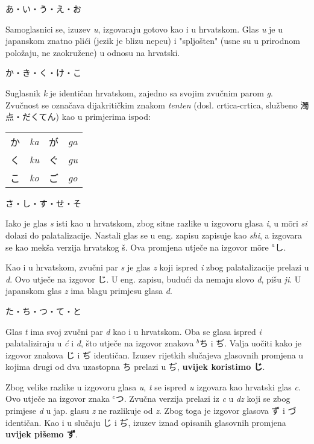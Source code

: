 	
	\noindent\ten あ・い・う・え・お
	
	Samoglasnici se, izuzev \textit{u}, izgovaraju gotovo kao i u hrvatskom. Glas \textit{u} je u japanskom znatno plići (jezik je blizu nepcu) i "spljošten" (usne su u prirodnom položaju, ne zaokružene) u odnosu na hrvatski.
	
	\vspace{5pt}
	\noindent\ten か・き・く・け・こ
	
	Suglasnik \textit{k} je identičan hrvatskom, zajedno sa svojim zvučnim parom \textit{g}. Zvučnost se označava dijakritičkim znakom \textit{tenten} (dosl. crtica-crtica, službeno 濁点・だくてん) kao u primjerima ispod:
	
	\begin{tabular}{l l l l}
		か&\textit{ka}&が&\textit{ga}\\
		く&\textit{ku}&ぐ&\textit{gu}\\
		こ&\textit{ko}&ご&\textit{go}\\
	\end{tabular}

	\vspace{5pt}
	\noindent\ten さ・し・す・せ・そ
	
	Iako je glas \textit{s} isti kao u hrvatskom, zbog sitne razlike u izgovoru glasa \textit{i}, u m\={o}ri \textit{si} dolazi do palatalizacije. Nastali glas se u eng. zapisu zapisuje kao \textit{shi}, a izgovara se kao mekša verzija hrvatskog š. Ova promjena utječe na izgovor m\={o}re $^a$し.
	
	Kao i u hrvatskom, zvučni par \textit{s} je glas \textit{z} koji ispred \textit{i} zbog palatalizacije prelazi u \textit{đ}. Ovo utječe na izgovor じ. U eng. zapisu, budući da nemaju slovo \textit{đ}, pišu \textit{ji}. U japanskom glas \textit{z} ima blagu primjesu glasa \textit{d}.
	
	\vspace{5pt}
	\noindent\ten た・ち・つ・て・と
	
	Glas \textit{t} ima svoj zvučni par \textit{d} kao i u hrvatskom. Oba se glasa ispred \textit{i} palataliziraju u \textit{ć} i \textit{đ}, što utječe na izgovor znakova $^b$ち i ぢ. Valja uočiti kako je izgovor znakova じ i ぢ identičan. Izuzev rijetkih slučajeva glasovnih promjena u kojima drugi od dva uzastopna ち prelazi u ぢ, \textbf{uvijek koristimo じ}.
	
	Zbog velike razlike u izgovoru glasa \textit{u}, \textit{t} se ispred \textit{u} izgovara kao hrvatski glas \textit{c}. Ovo utječe na izgovor znaka $^c$つ. Zvučna verzija prelazi iz \textit{c} u \textit{dz} koji se zbog primjese \textit{d} u jap. glasu \textit{z} ne razlikuje od \textit{z}. Zbog toga je izgovor glasova ず i づ identičan. Kao i u slučaju じ i ぢ, izuzev iznad opisanih glasovnih promjena \textbf{uvijek pišemo ず}.
	
